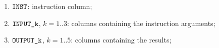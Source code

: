 \begin{enumerate}
\item
	\godGiven{}
	$\texttt{INST}{}$:
	instruction column;
    \item
	\godGiven{}
	$\texttt{INPUT\_k}$, $k=1..3$:
	columns containing the instruction arguments;
    \item
	\markAsJustifiedHere{}
	$\texttt{OUTPUT\_k}$, $k=1..5$:
	columns containing the results;
\end{enumerate}